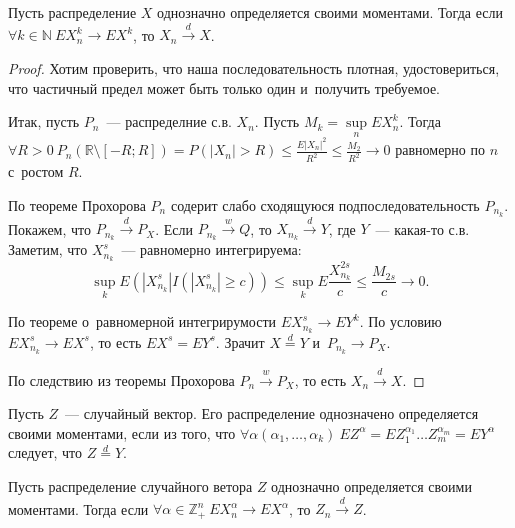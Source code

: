 \documentclass{article}
\begin{document}
\begin{theorem}
	Пусть распределение $X$ однозначно определяется своими моментами. Тогда если
	$\forall k \in \mathbb{N}\  EX_n^k \rightarrow EX^k$, то $X_n
	\overset{d}\rightarrow X$.
\end{theorem}
\begin{proof}
	Хотим проверить, что наша последовательность плотная, удостовериться, что
	частичный предел может быть только один и~получить требуемое.

	Итак, пусть $P_n$~--- распределние с.в. $X_n$. Пусть $M_k = \sup\limits_n
	EX_n^k$. Тогда $\forall R > 0\ P_n(\mathbb{R} \setminus [-R; R]) = P(|X_n| >
	R) \le \frac{E|X_n|^2}{R^2} \le \frac{M_2}{R^2} \rightarrow 0$ равномерно по
	$n$ с~ростом $R$.

	По теореме Прохорова $P_n$ содерит слабо сходящуюся подпоследовательность
	$P_{n_k}$. Покажем, что $P_{n_k} \overset{d}\rightarrow P_X$. Если $P_{n_k}
	\overset{w}\rightarrow Q$, то $X_{n_k} \overset{d}\rightarrow Y$, где $Y$~---
	какая-то с.в. Заметим, что $X_{n_k}^s$~--- равномерно интегрируема:
	$$ \sup\limits_k E(|X_{n_k}^s| I(|X_{n_k}^s| \ge c)) \le \sup\limits_k
	E\frac{X_{n_k}^{2s}}{c} \le \frac{M_{2s}}{c} \rightarrow 0.$$

	По теореме о~равномерной интегрирумости $EX_{n_k}^s \rightarrow EY^k$. По
	условию $EX_{n_k}^s \rightarrow EX^s$, то есть $EX^s = EY^s$. Зрачит $X
	\overset{d}= Y$ и~$P_{n_k} \rightarrow P_X$.

	По следствию из теоремы Прохорова $P_n \overset{w}\rightarrow P_X$, то есть
	$X_n \overset{d}\rightarrow X$.
\end{proof}

\begin{definition}
	Пусть $Z$~--- случайный вектор. Его распределение однозначено определяется
	своими моментами, если из того, что $\forall \alpha (\alpha_1, \ldots,
	\alpha_k)\ EZ^\alpha = EZ_1^{\alpha_1} \ldots Z_m^{\alpha_m} = EY^\alpha$
	следует, что $Z \overset{d} = Y$.
\end{definition}

\begin{theorem}
	Пусть распределение случайного ветора $Z$ однозначно определяется своими
	моментами. Тогда если $\forall \alpha \in \mathbb{Z}_+^n\ EX_n^\alpha
	\rightarrow EX^\alpha$, то $Z_n \overset{d}\rightarrow Z$.
\end{theorem}
\end{document}
